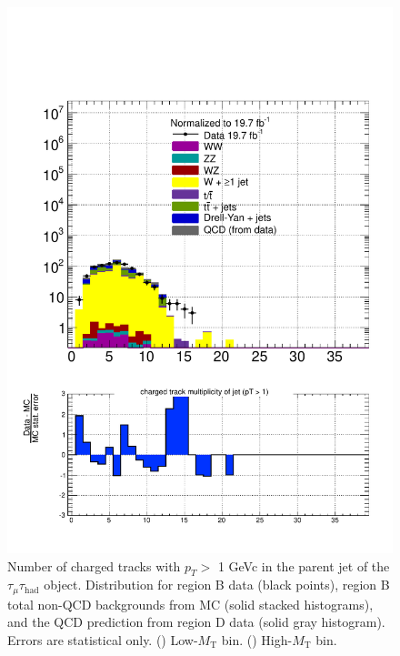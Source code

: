 \begin{figure}[hbtp]
\begin{center}
    \includegraphics[width=\cmsFigWidth]{figures/dataVsMCQCD_muHadNchtrk1_highMT_v87}
    \caption{Number of charged tracks with $p_T >$ 1 GeVc in the parent jet of the $\tau_{\mu}\tau_{\text{had}}$ object. Distribution for region B data (black points), region B total non-QCD backgrounds from MC (solid stacked histograms), and the QCD prediction from region D data (solid gray histogram).  Errors are statistical only. (\cmsLeft) Low-$M_{\text{T}}$ bin. (\cmsRight) High-$M_{\text{T}}$ bin.}
    \label{fig:regB-data-MC-muHadNchtrk1}
  \end{center}
\end{figure}

